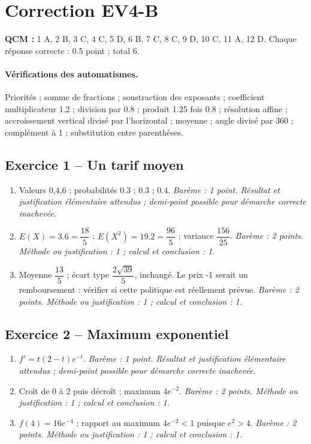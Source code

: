 \mxnewpage\section*{Correction EV4-B}\label{EV4-B-CORR}
\textbf{QCM :} 1 A, 2 B, 3 C, 4 C, 5 D, 6 B, 7 C, 8 C, 9 D, 10 C, 11 A, 12 D. Chaque réponse correcte : \num{0,5} point ; total 6.
\paragraph{Vérifications des automatismes.} Priorités ; somme de fractions ; soustraction des exposants ; coefficient multiplicateur \num{1,2} ; division par \num{0,8} ; produit \num{1,25} fois \num{0,8} ; résolution affine ; accroissement vertical divisé par l’horizontal ; moyenne ; angle divisé par 360 ; complément à 1 ; substitution entre parenthèses.
\subsection*{Exercice 1 -- Un tarif moyen}
\begin{enumerate}
\item Valeurs 0,4,6 ; probabilités \num{0,3} ; \num{0,3} ; \num{0,4}. \textit{Barème : 1 point. Résultat et justification élémentaire attendus ; demi-point possible pour démarche correcte inachevée.}
\item $E(X)=\num{3,6}=\dfrac{18}{5}$ ; $E(X^2)=\num{19,2}=\dfrac{96}{5}$ ; variance $\dfrac{156}{25}$. \textit{Barème : 2 points. Méthode ou justification : 1 ; calcul et conclusion : 1.}
\item Moyenne $\dfrac{13}{5}$ ; écart type $\dfrac{2\sqrt {39}}{5}$, inchangé. Le prix -1 serait un remboursement : vérifier si cette politique est réellement prévue. \textit{Barème : 2 points. Méthode ou justification : 1 ; calcul et conclusion : 1.}
\end{enumerate}
\subsection*{Exercice 2 -- Maximum exponentiel}
\begin{enumerate}
\item $f\prime=t(2-t)e^{-t}$. \textit{Barème : 1 point. Résultat et justification élémentaire attendus ; demi-point possible pour démarche correcte inachevée.}
\item Croît de 0 à 2 puis décroît ; maximum $4e^{-2}$. \textit{Barème : 2 points. Méthode ou justification : 1 ; calcul et conclusion : 1.}
\item $f(4)=16e^{-4}$ ; rapport au maximum $4e^{-2}<1$ puisque $e^2>4$. \textit{Barème : 2 points. Méthode ou justification : 1 ; calcul et conclusion : 1.}
\end{enumerate}

